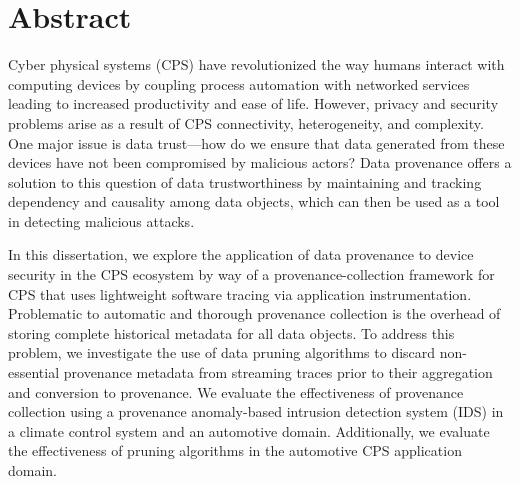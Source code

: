 

\chapter*{Abstract}
Cyber physical systems (CPS) have revolutionized the way humans interact with computing devices by coupling process automation with networked services leading to increased productivity and ease of life. However, privacy and security problems arise as a result of CPS connectivity, heterogeneity, and complexity. One major issue is data trust---how do we ensure that data generated from these devices have not been compromised by malicious actors? Data provenance offers a solution to this question of data trustworthiness by maintaining and tracking dependency and causality among data objects, which can then be used as a tool in detecting malicious attacks.

In this dissertation, we explore the application of data provenance to device security in the CPS ecosystem by way of a provenance-collection framework for CPS that uses lightweight software tracing via application instrumentation. Problematic to automatic and thorough provenance collection is the overhead of storing complete historical metadata for all data objects. To address this problem, we investigate the use of data pruning algorithms to discard non-essential provenance metadata from streaming traces prior to their aggregation and conversion to provenance. We evaluate the effectiveness of provenance collection using a provenance anomaly-based intrusion detection system (IDS) in a climate control system and an automotive domain. Additionally, we evaluate the effectiveness of  pruning algorithms in the automotive CPS application domain.






